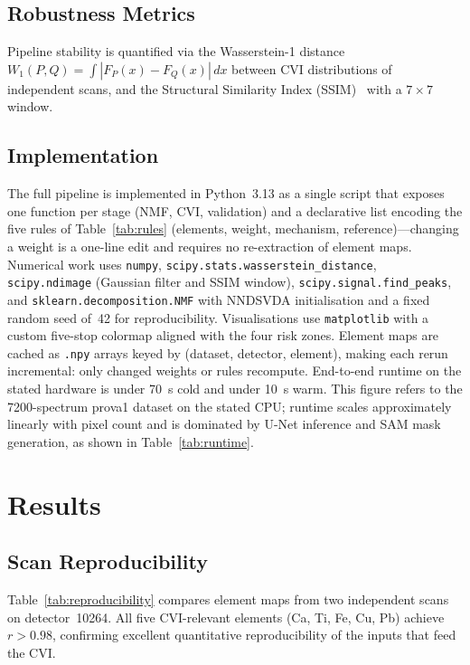 \documentclass[conference]{IEEEtran}
\begin{document}
\subsection{Robustness Metrics}

Pipeline stability is quantified via the Wasserstein-1 distance~\cite{villani2009optimal} $W_1(P,Q) = \int |F_P(x) - F_Q(x)|\,dx$ between CVI distributions of independent scans, and the Structural Similarity Index (SSIM)~\cite{wang2004image} with a $7{\times}7$ window.

\subsection{Implementation}

The full pipeline is implemented in Python~3.13 as a single script that exposes one function per stage (NMF, CVI, validation) and a declarative list encoding the five rules of Table~\ref{tab:rules} (elements, weight, mechanism, reference)---changing a weight is a one-line edit and requires no re-extraction of element maps. Numerical work uses \texttt{numpy}, \texttt{scipy.stats.wasserstein\_distance}, \texttt{scipy.ndimage} (Gaussian filter and SSIM window), \texttt{scipy.signal.find\_peaks}, and \texttt{sklearn.decomposition.NMF} with NNDSVDA initialisation and a fixed random seed of~42 for reproducibility. Visualisations use \texttt{matplotlib} with a custom five-stop colormap aligned with the four risk zones. Element maps are cached as \texttt{.npy} arrays keyed by (dataset, detector, element), making each rerun incremental: only changed weights or rules recompute. End-to-end runtime on the stated hardware is under 70~s cold and under 10~s warm. This figure refers to the 7200-spectrum prova1 dataset on the stated CPU; runtime scales approximately linearly with pixel count and is dominated by U-Net inference and SAM mask generation, as shown in Table~\ref{tab:runtime}.

\section{Results}

\subsection{Scan Reproducibility}

Table~\ref{tab:reproducibility} compares element maps from two independent scans on detector~10264. All five CVI-relevant elements (Ca, Ti, Fe, Cu, Pb) achieve $r > 0.98$, confirming excellent quantitative reproducibility of the inputs that feed the CVI.
\end{document}
